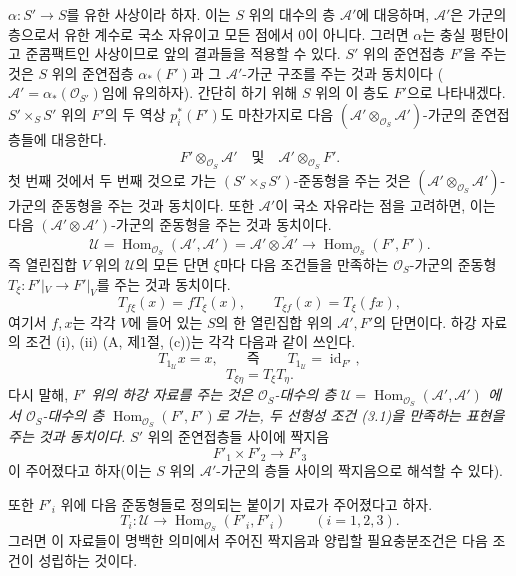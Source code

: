 $\alpha:S'\longrightarrow S$를 유한 사상이라 하자. 이는 $S$ 위의
대수의 층 $\mathcal A'$에 대응하며, $\mathcal A'$은 가군의 층으로서
유한 계수로 국소 자유이고 모든 점에서 $0$이 아니다. 그러면
$\alpha$는 충실 평탄이고 준콤팩트인 사상이므로 앞의 결과들을 적용할
수 있다. $S'$ 위의 준연접층 $F'$을 주는 것은 $S$ 위의 준연접층
$\alpha_*(F')$과 그 $\mathcal A'$-가군 구조를 주는 것과 동치이다
($\mathcal A'=\alpha_*(\mathcal O_{S'})$임에 유의하자). 간단히 하기
위해 $S$ 위의 이 층도 $F'$으로 나타내겠다. $S'\times_SS'$ 위의
$F'$의 두 역상 $p_i^*(F')$도 마찬가지로 다음
$(\mathcal A'\otimes_{\mathcal O_S}\mathcal A')$-가군의 준연접층들에
대응한다.
\[
  F'\otimes_{\mathcal O_S}\mathcal A'
  \quad\text{및}\quad
  \mathcal A'\otimes_{\mathcal O_S}F'.
\]
첫 번째 것에서 두 번째 것으로 가는
$(S'\times_SS')$-준동형을 주는 것은
$(\mathcal A'\otimes_{\mathcal O_S}\mathcal A')$-가군의 준동형을
주는 것과 동치이다. 또한 $\mathcal A'$이 국소 자유라는 점을
고려하면, 이는 다음 $(\mathcal A'\otimes\mathcal A')$-가군의
준동형을 주는 것과 동치이다.
\[
  \mathcal U=
  \operatorname{Hom}_{\mathcal O_S}(\mathcal A',\mathcal A')
  =\mathcal A'\otimes\check{\mathcal A}'
  \longrightarrow
  \operatorname{Hom}_{\mathcal O_S}(F',F').
\]
즉 열린집합 $V$ 위의 $\mathcal U$의 모든 단면 $\xi$마다 다음
조건들을 만족하는 $\mathcal O_S$-가군의 준동형
$T_\xi:F'|_V\longrightarrow F'|_V$를 주는 것과 동치이다.
\begin{equation}
  T_{f\xi}(x)=fT_\xi(x),
  \qquad T_{\xi f}(x)=T_\xi(fx),
  \tag{3.1}
\end{equation}
여기서 $f,x$는 각각 $V$에 들어 있는 $S$의 한 열린집합 위의
$\mathcal A',F'$의 단면이다. 하강 자료의 조건 (i), (ii)
(A, 제1절, (c))는 각각 다음과 같이 쓰인다.
\begin{equation}
  T_{1_{\mathcal U}}x=x,
  \qquad\text{즉}\qquad
  T_{1_{\mathcal U}}=\operatorname{id}_{F'},
  \tag{3.2}
\end{equation}
\begin{equation}
  T_{\xi\eta}=T_\xi T_\eta.
  \tag{3.3}
\end{equation}
다시 말해, \emph{$F'$ 위의 하강 자료를 주는 것은
$\mathcal O_S$-대수의 층
$\mathcal U=\operatorname{Hom}_{\mathcal O_S}(\mathcal A',\mathcal A')$
에서 $\mathcal O_S$-대수의 층
$\operatorname{Hom}_{\mathcal O_S}(F',F')$로 가는, 두 선형성 조건
(3.1)을 만족하는 표현을 주는 것과 동치이다.} $S'$ 위의 준연접층들
사이에 짝지음
\[
  F'_1\times F'_2\longrightarrow F'_3
\]
이 주어졌다고 하자(이는 $S$ 위의 $\mathcal A'$-가군의 층들 사이의
짝지음으로 해석할 수 있다).

또한 $F'_i$ 위에 다음 준동형들로 정의되는 붙이기 자료가 주어졌다고
하자.
\[
  T_i:\mathcal U\longrightarrow
  \operatorname{Hom}_{\mathcal O_S}(F'_i,F'_i)
  \qquad (i=1,2,3).
\]
그러면 이 자료들이 명백한 의미에서 주어진 짝지음과 양립할
필요충분조건은 다음 조건이 성립하는 것이다.

